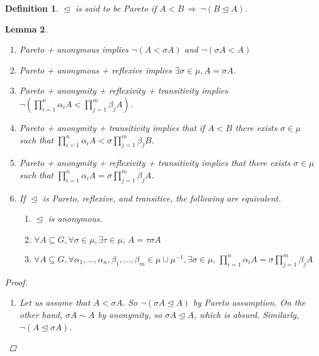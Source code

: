 \documentclass[11pt]{article}
\newtheorem{definition}{Definition}
\newtheorem{lemma}[definition]{Lemma}
\newcommand{\releq}{\mathrel{\trianglelefteq}}
\begin{document}
\begin{definition}
$\releq$ is said to be Pareto if $A < B \,\Rightarrow\, \neg (B \releq A)$. 
\end{definition}



\begin{lemma}\label{lem:pareto}
\begin{enumerate}
 \item\label{lem:pareto1} Pareto + anonymous implies $\neg(A < \sigma A)$ and $\neg(\sigma A < A)$

  \item\label{lem:pareto2} Pareto + anonymous + reflexive implies $\exists \sigma \in \mu, A = \sigma A$.
 
 

 \item\label{lem:pareto3} Pareto + anonymity + reflexivity + transitivity implies $\neg(\prod_{i =1}^n \alpha_i A < \prod_{j =1}^m \beta_j A)$.
 
 
  \item\label{lem:pareto4} Pareto + anonymity + transitivity implies that if $A < B$ there exists $\sigma \in \mu$ such that $\prod_{i =1}^n \alpha_i A < \sigma \prod_{j =1}^m \beta_j B$.
 
 \item\label{lem:pareto5} Pareto + anonymity + reflexivity + transitivity implies that there exists $\sigma \in \mu$ such that $\prod_{i =1}^n \alpha_i A = \sigma \prod_{j =1}^m \beta_j A$.
 
 
 \item\label{lem:pareto6} If $\releq$ is Pareto, reflexive, and transitive, the following are equivalent.
  \begin{enumerate}
   \item $\releq$ is anonymous.
   
   \item $\forall A \subseteq G, \forall \sigma \in \mu, \exists \tau \in \mu, \, A = \tau \sigma A$ 
   
   \item $\forall A \subseteq G, \forall \alpha_1,\dots,\alpha_n,\beta_1,\dots, \beta_m \in \mu \cup \mu^{-1}, \exists \sigma \in \mu, \, \prod_{i =1}^n \alpha_i A = \sigma \prod_{j =1}^m \beta_j A$
  \end{enumerate}
\end{enumerate}

\begin{proof}
 \begin{enumerate}
  \item Let us assume that $A < \sigma A$. So $\neg ( \sigma A \releq A)$ by Pareto assumption. On the other hand, $\sigma A \sim A$ by anonymity, so $\sigma A \releq A$, which is absurd. Similarly, $\neg(A \releq \sigma A)$.
  

\end{enumerate}
\end{proof}
\end{lemma}
\end{document}
